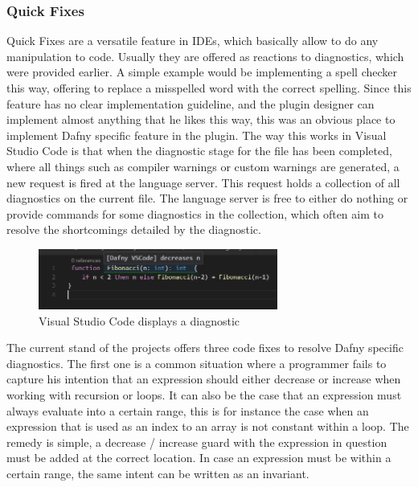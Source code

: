 \subsubsection{Quick Fixes} \label{quickfixes}
Quick Fixes are a versatile feature in IDEs, which basically allow to do any manipulation to code. Usually they are offered as reactions to diagnostics, which were provided earlier. A simple example would be implementing a spell checker this way, offering to replace a misspelled word with the correct spelling. \newline
Since this feature has no clear implementation guideline, and the plugin designer can implement almost anything that he likes this way, this was an obvious place to implement Dafny specific feature in the plugin.\newline
The way this works in Visual Studio Code is that when the diagnostic stage for the file has been completed, where all things such as compiler warnings or custom warnings are generated, a new request is fired at the language server. This request holds a collection of all diagnostics on the current file. The language server is free to either do nothing or provide commands for some diagnostics in the collection, which often aim to resolve the shortcomings detailed by the diagnostic. \newline
  \begin{figure}[H]
	\centering
	\includegraphics[width=0.7\textwidth]{img/diagnostic}
	\caption{Visual Studio Code displays a diagnostic}
	\label{fig:diagnostic}
\end{figure}
The current stand of the projects offers three code fixes to resolve Dafny specific diagnostics. \newline
The first one is a common situation where a programmer fails to capture his intention that an expression should either decrease or increase when working with recursion or loops. It can also be the case that an expression must always evaluate into a certain range, this is for instance the case when an expression that is used as an index to an array is not constant within a loop. The remedy is simple, a decrease / increase guard with the expression in question must be added at the correct location. In case an expression must be within a certain range, the same intent can be written as an invariant. \newline
